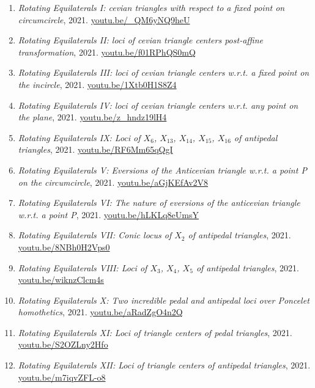 \documentclass[12pt]{article}
\begin{document}
\begin{enumerate}[resume]
\item \textit{Rotating Equilaterals I: cevian triangles with respect to a fixed point on circumcircle}, 2021. \href{https://youtu.be/_QM6yNQ9heU}{\url{youtu.be/\_QM6yNQ9heU}}
\item \textit{Rotating Equilaterals II: loci of cevian triangle centers post-affine transformation}, 2021. \href{https://youtu.be/f01RPhQS0mQ}{\url{youtu.be/f01RPhQS0mQ}}
\item \textit{Rotating Equilaterals III: loci of cevian triangle centers w.r.t. a fixed point on the incircle}, 2021. \href{https://youtu.be/1Xtb0H1S8Z4}{\url{youtu.be/1Xtb0H1S8Z4}}
\item \textit{Rotating Equilaterals IV: loci of cevian triangle centers w.r.t. any point on the plane}, 2021. \href{https://youtu.be/z_hndz19lH4}{\url{youtu.be/z\_hndz19lH4}}
\item \textit{Rotating Equilaterals IX: Loci of $X_{6}$, $X_{13}$, $X_{14}$, $X_{15}$, $X_{16}$ of antipedal triangles}, 2021. \href{https://youtu.be/RF6Mm65qQgI}{\url{youtu.be/RF6Mm65qQgI}}
\item \textit{Rotating Equilaterals V: Eversions of the Anticevian triangle w.r.t. a point P on the circumcircle}, 2021. \href{https://youtu.be/aGjKEfAv2V8}{\url{youtu.be/aGjKEfAv2V8}}
\item \textit{Rotating Equilaterals VI: The nature of eversions of the anticevian triangle w.r.t. a point P}, 2021. \href{https://youtu.be/hLKLq8eUmsY}{\url{youtu.be/hLKLq8eUmsY}}
\item \textit{Rotating Equilaterals VII: Conic locus of $X_{2}$ of antipedal triangles}, 2021. \href{https://youtu.be/8NBh0H2Vps0}{\url{youtu.be/8NBh0H2Vps0}}
\item \textit{Rotating Equilaterals VIII: Loci of $X_{3}$, $X_{4}$, $X_{5}$ of antipedal triangles}, 2021. \href{https://youtu.be/wiknzClcm4s}{\url{youtu.be/wiknzClcm4s}}
\item \textit{Rotating Equilaterals X: Two incredible pedal and antipedal loci over Poncelet homothetics}, 2021. \href{https://youtu.be/aRadZgO4n2Q}{\url{youtu.be/aRadZgO4n2Q}}
\item \textit{Rotating Equilaterals XI: Loci of triangle centers of pedal triangles}, 2021. \href{https://youtu.be/S2OZLny2Hfo}{\url{youtu.be/S2OZLny2Hfo}}
\item \textit{Rotating Equilaterals XII: Loci of triangle centers of antipedal triangles}, 2021. \href{https://youtu.be/m7iqvZFL-o8}{\url{youtu.be/m7iqvZFL-o8}}
\end{enumerate}
\end{document}
